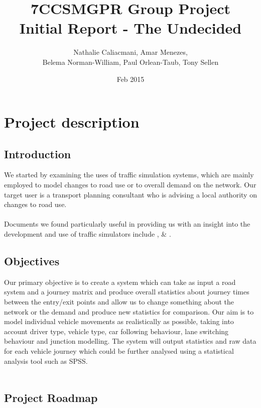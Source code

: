 \documentclass[11pt]{article}
\begin{document}
	\title{7CCSMGPR Group Project\\Initial Report - The Undecided}
	\author{Nathalie Caliacmani, Amar Menezes, \\ Belema Norman-William, Paul Orlean-Taub, Tony Sellen}
	\date{Feb 2015}
	\maketitle
	\section{Project description}
	\subsection{Introduction}

	We started by examining the uses of traffic simulation systems, which are mainly employed to model
	changes to road use or to overall demand on the network.
	Our target user is a transport planning consultant who is advising a local authority on changes to road use.
\\	\\
	Documents we found particularly useful in providing us with an insight into the development and use
	of traffic simulators include \cite{namekawal}, \cite{traff} \& \cite{vistraff}.		
		
\subsection{Objectives}
	Our primary objective is to create a system which can take as input a road system
	and a journey matrix and produce overall statistics about journey times between the entry/exit points
	and allow us to change something about the network or the demand and produce new statistics for
	comparison. Our aim is to model individual vehicle movements as realistically as possible, taking 
	into account driver type, vehicle type, car following behaviour, lane switching behaviour and junction
	modelling. The system will output statistics and raw data for each vehicle journey which could be
	further analysed using a statistical analysis tool such as SPSS.
\\ \\
	\subsection{Project Roadmap}
	
\end{document}
